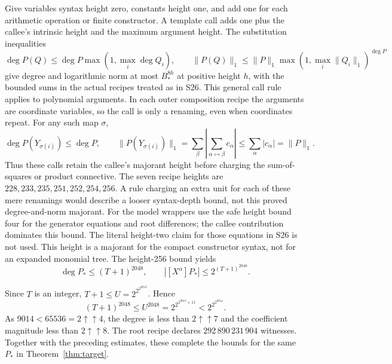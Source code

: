 \documentclass[11pt]{article}
\theoremstyle{definition}
\theoremstyle{remark}
\newcommand{\tw}[1]{2\mathbin{\uparrow\!\uparrow}#1}
\begin{document}
Give variables syntax height zero, constants height one, and add one
for each arithmetic operation or finite constructor. A template call
adds one plus the callee's intrinsic height and the maximum argument
height. The substitution inequalities
\[
 \deg P(Q)\le\deg P\max(1,\max_i\deg Q_i),\qquad
 \|P(Q)\|_1\le\|P\|_1\max(1,\max_i\|Q_i\|_1)^{\deg P}
\]
give degree and logarithmic norm at most $B_*^{8h}$ at positive height
$h$, with the bounded sums in the actual recipes treated as in S26.
This general call rule applies to polynomial arguments. In each outer
composition recipe the arguments are coordinate variables, so the call
is only a renaming, even when coordinates repeat. For any such map
$\sigma$,
\[
 \deg P(Y_{\sigma(i)})\le\deg P,\qquad
 \|P(Y_{\sigma(i)})\|_1
 =\sum_\beta\left|\sum_{\alpha\mapsto\beta}c_\alpha\right|
 \le\sum_\alpha|c_\alpha|=\|P\|_1.
\]
Thus these calls retain the callee's majorant height before charging
the sum-of-squares or product connective. The seven recipe heights are
$228,233,235,251,252,254,256$. A rule charging an extra unit for each
of these mere renamings would describe a looser syntax-depth bound,
not this proved degree-and-norm majorant.
For the model wrappers use the safe height bound four for the
generator equations and root differences; the callee contribution
dominates this bound. The literal height-two claim for those equations
in S26 is not used.
This height is a majorant for the compact constructor syntax, not for
an expanded monomial tree. The height-256 bound yields
\[
 \deg P_*\le(T+1)^{2048},\qquad
 |[X^\alpha]P_*|\le2^{(T+1)^{2048}}.
\]

Since $T$ is an integer, $T+1\le U=2^{2^{2^{9013}}}$. Hence
\[
 (T+1)^{2048}\le U^{2048}=2^{2^{2^{9013}+11}}
                     <2^{2^{2^{9014}}}.
\]
As $9014<65536=\tw4$, the degree is less than $\tw7$ and the
coefficient magnitude less than $\tw8$. The root recipe declares
$292\,890\,231\,904$ witnesses. Together with the preceding estimates,
these complete the bounds for the same $P_*$ in
Theorem~\ref{thm:target}.
\end{document}
